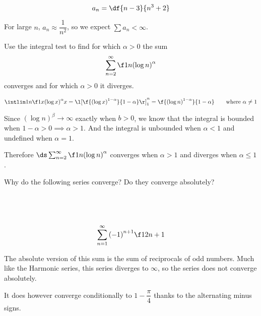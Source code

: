 \documentclass[a4paper]{article}
\begin{document}
\subsection{~} %

\begin{questionbody}
\[ a_n = \df{n - 3}{n^3 + 2} \]
\end{questionbody}

For large $n$, $a_n \approx \dfrac{1}{n^2}$, so we expect $\sum a_n < \infty$.


\begin{questionbody}
Use the integral test to find for which $\alpha > 0$ the sum \[
\sum_{n=2}^\infty \f 1{n {(\log n)}^\alpha}
\] converges and for which $\alpha > 0$ it diverges.
\end{questionbody}

\[
\intlim 1n {\f1{x {(\log x)}^\alpha}} x = {\l[ \f{{(\log x)}^{1 - \alpha}}{1 - \alpha} \r]}_1^n = \f{{(\log n)}^{1 - \alpha}}{1 - \alpha} \qquad \text{where } \alpha \ne 1
\]

Since ${(\log n)}^\beta \to \infty$ exactly when $b > 0$, we know that the integral is bounded when $1 - \alpha > 0 \implies \alpha > 1$. And the integral is unbounded when $\alpha < 1$ and undefined when $\alpha = 1$.

Therefore $\ds\sum_{n=2}^\infty \f1{n {(\log n)}^\alpha}$ converges when $\alpha > 1$ and diverges when $\alpha \le 1$.


\begin{questionbody}
Why do the following series converge? Do they converge absolutely?
\end{questionbody}

\subsection{~} %

\begin{questionbody}
\[ \sum_{n=1}^\infty {(-1)}^{n+1} \f1{2n+1} \]
\end{questionbody}

The absolute version of this sum is the sum of reciprocals of odd numbers. Much like the Harmonic series, this series diverges to $\infty$, so the series does not converge absolutely.

It does however converge conditionally to $1 - \dfrac\pi4$ thanks to the alternating minus signs.
\end{document}
